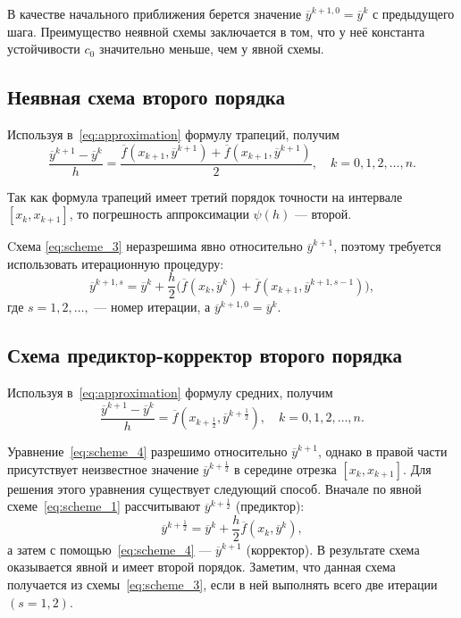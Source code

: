 В качестве начального приближения берется значение
\( \overline{y}^{k+1, 0} = \overline{y}^k \) с предыдущего шага.
Преимущество неявной схемы заключается в том, что у неё константа устойчивости
\( c_0 \) значительно меньше, чем у явной схемы.

\subsection{Неявная схема второго порядка}

Используя в~\eqref{eq:approximation} формулу трапеций, получим
\begin{equation}
  \dfrac{\overline{y}^{k+1} - \overline{y}^k}{h} =
  \dfrac{
    \overline{f}(x_{k+1}, \overline{y}^{k+1}) +
    \overline{f}(x_{k+1}, \overline{y}^{k+1})}{
    2
  }, \quad
  k = 0, 1, 2, \ldots, n.
  \label{eq:scheme_3}
\end{equation}

Так как формула трапеций имеет третий порядок точности на интервале
\( [x_k, x_{k+1}] \), то погрешность аппроксимации \( \psi(h) \) --- второй.

Cхема \eqref{eq:scheme_3} неразрешима явно относительно \( \overline{y}^{k+1} \),
поэтому требуется использовать итерационную процедуру:
\begin{equation}
  \overline{y}^{k+1, s} = \overline{y}^k +
  \dfrac{h}{2} \bigg(
  \overline{f}(x_k, \overline{y}^k) +
  \overline{f}(x_{k+1}, \overline{y}^{k+1, s-1})
  \bigg),
\end{equation}
где \( s = 1, 2, \ldots, \) --- номер итерации, а
\( \overline{y}^{k+1, 0} = \overline{y}^k \).

\subsection{Схема предиктор-корректор второго порядка}

Используя в~\eqref{eq:approximation} формулу средних, получим
\begin{equation}
  \dfrac{\overline{y}^{k+1} - \overline{y}^k}{h} =
  \overline{f}(x_{k+\frac{1}{2}}, \overline{y}^{k+\frac{1}{2}}), \quad
  k = 0, 1, 2, \ldots, n.
  \label{eq:scheme_4}
\end{equation}

Уравнение~\eqref{eq:scheme_4} разрешимо относительно \( \overline{y}^{k+1} \),
однако в правой части присутствует неизвестное значение
\( \overline{y}^{k+\frac{1}{2}} \) в середине отрезка \( [x_k, x_{k+1}] \).
Для решения этого уравнения существует следующий способ.
Вначале по явной схеме~\eqref{eq:scheme_1} рассчитывают
\( \overline{y}^{k+\frac{1}{2}} \) (предиктор):
\begin{equation*}
  \overline{y}^{k+\frac{1}{2}} = \overline{y}^{k} +
  \dfrac{h}{2} \overline{f}(x_k, \overline{y}^k),
\end{equation*}
а затем с помощью~\eqref{eq:scheme_4} ---
\( \overline{y}^{k+1} \) (корректор).
В результате схема оказывается явной и имеет второй порядок.
Заметим, что данная схема получается из схемы~\eqref{eq:scheme_3},
если в ней выполнять всего две итерации \( (s = 1, 2) \).


